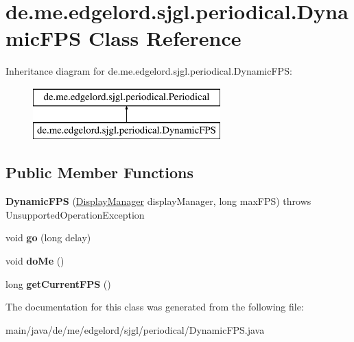 \hypertarget{classde_1_1me_1_1edgelord_1_1sjgl_1_1periodical_1_1_dynamic_f_p_s}{}\section{de.\+me.\+edgelord.\+sjgl.\+periodical.\+Dynamic\+F\+PS Class Reference}
\label{classde_1_1me_1_1edgelord_1_1sjgl_1_1periodical_1_1_dynamic_f_p_s}
Inheritance diagram for de.\+me.\+edgelord.\+sjgl.\+periodical.\+Dynamic\+F\+PS\+:\begin{figure}[H]
\begin{center}
\leavevmode
\includegraphics[height=2.000000cm]{classde_1_1me_1_1edgelord_1_1sjgl_1_1periodical_1_1_dynamic_f_p_s}
\end{center}
\end{figure}
\subsection*{Public Member Functions}
\begin{DoxyCompactItemize}
\item 
\mbox{\label{classde_1_1me_1_1edgelord_1_1sjgl_1_1periodical_1_1_dynamic_f_p_s_ab344c6d0ff9349a5dcb04bf07a4f4e5a}} 
{\bfseries Dynamic\+F\+PS} (\mbox{\hyperlink{classde_1_1me_1_1edgelord_1_1sjgl_1_1display_1_1_display_manager}{Display\+Manager}} display\+Manager, long max\+F\+PS)  throws Unsupported\+Operation\+Exception 
\item 
\mbox{\label{classde_1_1me_1_1edgelord_1_1sjgl_1_1periodical_1_1_dynamic_f_p_s_a2aacc8d6658081bcf416d9f0dc0da036}} 
void {\bfseries go} (long delay)
\item 
\mbox{\label{classde_1_1me_1_1edgelord_1_1sjgl_1_1periodical_1_1_dynamic_f_p_s_ac41d0339b31b8eaee3d0aaea404998f5}} 
void {\bfseries do\+Me} ()
\item 
\mbox{\label{classde_1_1me_1_1edgelord_1_1sjgl_1_1periodical_1_1_dynamic_f_p_s_aba28bdbc33fbc13185e124a87b03ef1d}} 
long {\bfseries get\+Current\+F\+PS} ()
\end{DoxyCompactItemize}


The documentation for this class was generated from the following file\+:\begin{DoxyCompactItemize}
\item 
main/java/de/me/edgelord/sjgl/periodical/Dynamic\+F\+P\+S.\+java\end{DoxyCompactItemize}
